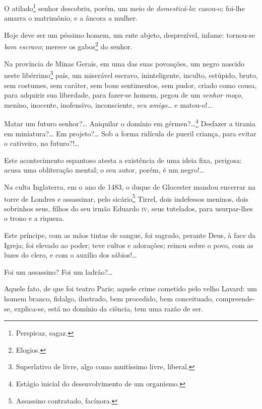   O atilado\footnote{Perspicaz, sagaz.} senhor descobriu, porém, um
    meio de \emph{domesticá-lo}: casou-o; foi-lhe amarra o matrimônio, e a
    âncora a mulher.

  Hoje deve ser um péssimo homem, um ente abjeto, desprezível, infame:
  tornou-se \emph{bom escravo}; merece os gabos\footnote{Elogios.} do
  senhor.

\asterisc

  Na província de Minas Gerais, em uma das suas povoações, um negro
  nascido neste libérrimo\footnote{Superlativo de livre,
  algo como muitíssimo livre, liberal.} país, um miserável escravo,
  ininteligente, inculto, estúpido, bruto, sem costumes, sem caráter,
  sem bons sentimentos, sem pudor, criado como cousa, para adquirir sua
  liberdade, para fazer-se homem, pegou de um \emph{senhor moço},
  menino, inocente, inofensivo, inconsciente, \emph{seu amigo}\ldots{} e
  matou-o!\ldots{}

  Matar um futuro senhor?\ldots{} Aniquilar o domínio em gérmen?\ldots{}\footnote{
    Estágio inicial do desenvolvimento de um organismo.} Desfazer a
  tirania em miniatura?\ldots{} Em projeto?\ldots{} Sob a forma ridícula de pueril
  criança, para evitar o cativeiro, no futuro?!\ldots{}

Este acontecimento espantoso atesta a existência de uma ideia fixa,
perigosa: acusa uma obliteração mental; o seu autor, porém, é um
negro!\ldots{}

\asterisc

Na culta Inglaterra, em o ano de 1483, o duque de Glocester mandou
encerrar na torre de Londres e assassinar, pelo sicário\footnote{
  Assassino contratado, facínora.} Tirrel, dois indefessos meninos, dois
sobrinhos seus, filhos do seu irmão Eduardo \textsc{iv}, seus tutelados, para
usurpar-lhes o trono e a riqueza.

Este príncipe, com as mãos tintas de sangue, foi sagrado, perante Deus,
à face da Igreja; foi elevado ao poder; teve cultos e adorações; reinou
sobre o povo, com as luzes do clero, e com o auxílio dos sábios!\ldots{}

Foi um assassino? Foi um ladrão?\ldots{}

\asterisc

Aquele fato, de que foi teatro Paris; aquele crime cometido pelo velho
Lavard: um homem branco, fidalgo, ilustrado, bem procedido, bem
conceituado, compreende-se, explica-se, está no domínio da ciência, tem
uma razão de ser.

